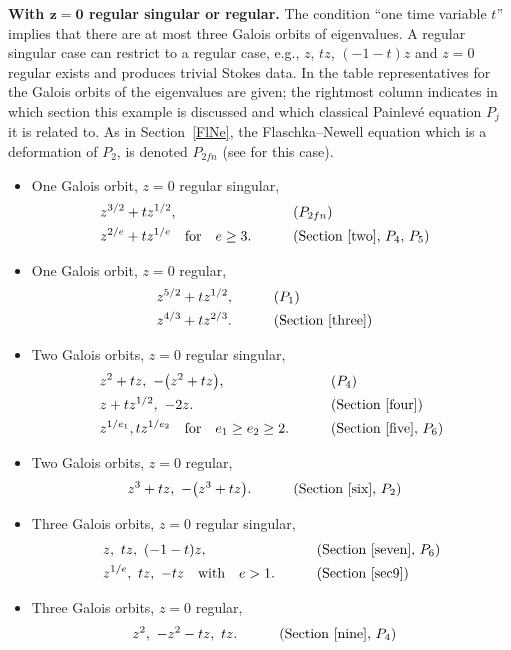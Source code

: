 \documentclass[10pt,a4paper]{amsart}
\numberwithin{equation}{section}
\begin{document}
{\bf With $\boldsymbol{z=0}$ regular singular or regular.}
The condition ``one time variable $t$'' implies that there are at most three Galois orbits of eigenvalues.
A regular singular case can restrict to a regular case, e.g., $z$, $tz$, $(-1-t)z$ and $z=0$ regular exists and produces trivial Stokes data. In the table representatives for the Galois orbits of the eigenvalues are given; the rightmost column indicates
in which section this example is discussed and which classical Painlev\'{e} equation $P_j$ it is related to. As in Section~\ref{FlNe}, the Flaschka--Newell
equation which is a deformation of $P_2$, is denoted $P_{2fn}$ (see \cite[Section~4.9]{vdP-Sa} for this case).
\begin{itemize}\itemsep=0pt
\item One Galois orbit, $z=0$ regular singular,
\begin{alignat*}{3}
 & z^{3/2}+tz^{1/2}, && (P_{2fn}) &&\\
 & z^{2/e}+tz^{1/e} \quad \text{for} \quad e\geq 3 .\qquad && (\text{Section~\ref{two}},\, P_4,\,P_5)&&
\end{alignat*}
\item One Galois orbit, $ z=0 $ regular,
\begin{alignat*}{3}
 & z^{5/2}+tz^{1/2}, \qquad&& (P_1) && \\
 & z^{4/3}+tz^{2/3} . && (\text{Section~\ref{three}})&&
 \end{alignat*}
\item Two Galois orbits, $ z=0 $ regular singular,
\begin{alignat*}{3}
 & z^2+tz , \ -\bigl(z^2+tz\bigr), && (P_4) \\
 & z+tz^{1/2} ,\ -2z . && (\text{Section~\ref{four}}) \\
 & z^{1/e_1} , tz^{1/e_2}\quad \text{for} \quad e_1\geq e_2\geq 2 .\qquad&& (\text{Section~\ref{five}}, \, P_6)
 \end{alignat*}
\item Two Galois orbits, $ z=0 $ regular,
\begin{alignat*}{3}
& z^3+tz ,\ -\bigl(z^3+tz\bigr) .\qquad && (\text{Section \ref{six}},\, P_2)
\end{alignat*}
\item Three Galois orbits, $ z=0 $ regular singular,
\begin{alignat*}{3}
 & z ,\ tz , \ (-1-t)z , \qquad&& (\text{Section \ref{seven}},\, P_6) \\
& z^{1/e} ,\ tz , \ -tz \quad \text{with}\quad e>1 .\qquad&& (\text{Section~\ref{sec9}}) \end{alignat*}
\item Three Galois orbits, $ z=0 $ regular,
\begin{alignat*}{3}
&z^2 , \ -z^2-tz , \ tz . \qquad&& (\text{Section \ref{nine}},\, P_4)
\end{alignat*}
\end{itemize}
\end{document}
